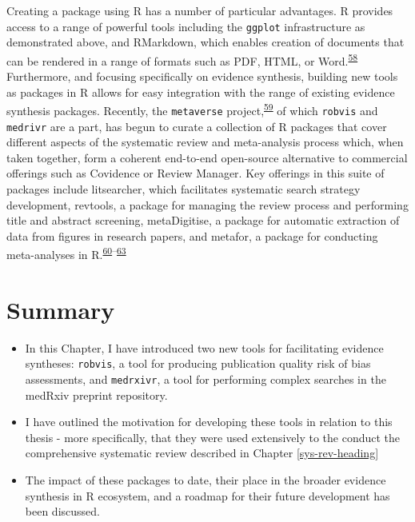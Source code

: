 \documentclass[a4paper, twoside]{templates/ociamthesis}
\begin{document}
Creating a package using R has a number of particular advantages. R provides access to a range of powerful tools including the \texttt{ggplot} infrastructure as demonstrated above, and RMarkdown, which enables creation of documents that can be rendered in a range of formats such as PDF, HTML, or Word.\textsuperscript{\protect\hyperlink{ref-xie2018r}{58}} Furthermore, and focusing specifically on evidence synthesis, building new tools as packages in R allows for easy integration with the range of existing evidence synthesis packages. Recently, the \texttt{metaverse} project,\textsuperscript{\protect\hyperlink{ref-variousauthors2020}{59}} of which \texttt{robvis} and \texttt{medrivr} are a part, has begun to curate a collection of R packages that cover different aspects of the systematic review and meta-analysis process which, when taken together, form a coherent end-to-end open-source alternative to commercial offerings such as Covidence or Review Manager. Key offerings in this suite of packages include litsearcher, which facilitates systematic search strategy development, revtools, a package for managing the review process and performing title and abstract screening, metaDigitise, a package for automatic extraction of data from figures in research papers, and metafor, a package for conducting meta-analyses in R.\textsuperscript{\protect\hyperlink{ref-grames2019automated}{60}--\protect\hyperlink{ref-westgate2019revtools}{63}}

\hypertarget{summary-2}{%
\section{Summary}\label{summary-2}}

\begin{itemize}
\item
  In this Chapter, I have introduced two new tools for facilitating evidence syntheses: \texttt{robvis}, a tool for producing publication quality risk of bias assessments, and \texttt{medrxivr}, a tool for performing complex searches in the medRxiv preprint repository.
\item
  I have outlined the motivation for developing these tools in relation to this thesis - more specifically, that they were used extensively to the conduct the comprehensive systematic review described in Chapter \ref{sys-rev-heading}
\item
  The impact of these packages to date, their place in the broader evidence synthesis in R ecosystem, and a roadmap for their future development has been discussed.
\end{itemize}
\end{document}
